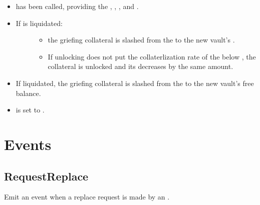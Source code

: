 \documentclass[a4paper,10pt,english]{sphinxmanual}
\begin{document}
\begin{itemize}
\item {} 
{\hyperref[\detokenize{spec/vault-registry:cancelreplacetokens}]{}} has been called, providing the , , , and .

\item {} \begin{description}
\item[{If  is  liquidated:}] \leavevmode\begin{itemize}
\item {} 
the griefing collateral is slashed from the  to the new vault’s .

\item {} 
If unlocking  does not put the collaterlization rate of the  below , the collateral is unlocked and its  decreases by the same amount.

\end{itemize}

\end{description}

\item {} 
If   liquidated, the griefing collateral is slashed from the  to the new vault’s free balance.

\item {} 
 is set to .

\end{itemize}


\section{Events}
\label{\detokenize{spec/replace:events}}

\subsection{RequestReplace}
\label{\detokenize{spec/replace:id13}}
Emit an event when a replace request is made by an .
\end{document}

